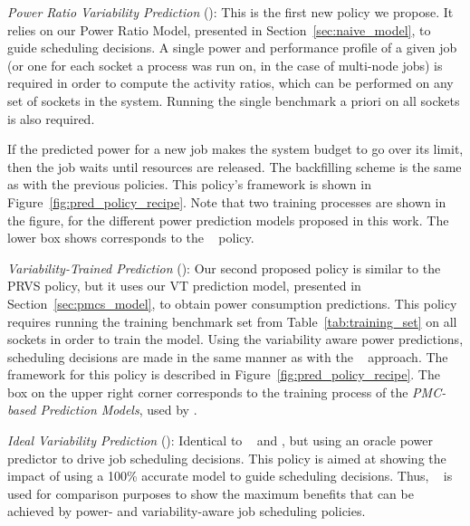 \par
\textit{Power Ratio Variability Prediction} (\PRVSSched):  This is the first new policy we
propose.  It relies on our Power Ratio Model, presented in Section~\ref{sec:naive_model},
to guide scheduling decisions.  A single power and performance profile of a given job (or
one for each socket a process was run on, in the case of multi-node jobs) is required in
order to compute the activity ratios, which can be performed on any set of sockets in the
system.  Running the single benchmark a priori on all sockets is also required. 
\par
If the predicted power for a new job makes the system budget to go over its limit, then
the job waits until resources are released.  The backfilling scheme is the same as with
the previous policies.  This policy's framework is shown in
Figure~\ref{fig:pred_policy_recipe}.  Note that two training processes are shown in the
figure, for the different power prediction models proposed in this work.  The lower box
shows corresponds to the \PRVSSched~ policy.
\par
\textit{Variability-Trained Prediction} (\PMCVSSched): Our second proposed policy is
similar to the PRVS policy, but it uses our VT prediction model, presented in
Section~\ref{sec:pmcs_model}, to obtain power consumption  predictions.
This policy requires running the training benchmark set from Table~\ref{tab:training_set}
on all sockets in order to train the model.  Using the variability aware power
predictions, scheduling decisions are made in the same manner as with the \PRVSSched~
approach.  The framework for this policy is described in
Figure~\ref{fig:pred_policy_recipe}.  The box on the upper right corner corresponds to the
training process of the \textit{PMC-based Prediction Models}, used by \PMCVSSched.
\par
\textit{Ideal Variability Prediction} (\IVSSched): Identical to \PRVSSched~ and
\PMCVSSched, but using an oracle power predictor to drive job scheduling decisions.  This
policy is aimed at showing the impact of using a 100\% accurate model to guide scheduling
decisions. Thus, \IVSSched~ is used for comparison purposes to show the maximum benefits
that can be achieved by power- and variability-aware job scheduling policies.

